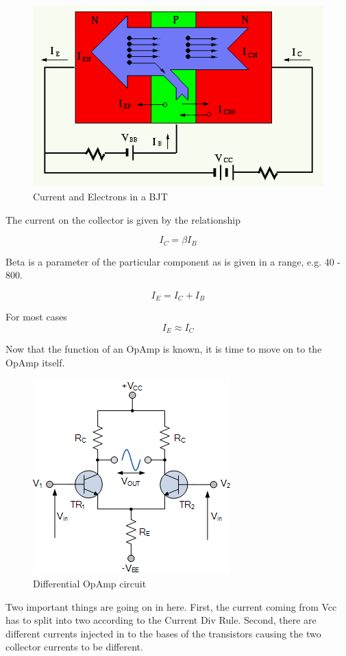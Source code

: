 \documentclass{article}
\begin{document}
	\begin{figure}[H]
		\centering
		\includegraphics[scale=0.75]{bjtelectrons2}
		\caption{Current and Electrons in a BJT\cite{bjt}}
	\end{figure}

	The current on the collector is given by the relationship

	\[I_C = {\beta}I_B \]

	Beta is a parameter of the particular component as is given in a range, e.g. 40 - 800.

	\[I_E = I_C + I_B \]

	For most cases \[I_E \approx I_C\]

	Now that the function of an OpAmp is known, it is time to move on to the
	OpAmp itself.

	\begin{figure}[H]
		\centering
		\includegraphics[scale=0.75]{OABones}
		\caption{Differential OpAmp circuit\cite{diff}}
	\end{figure}

	Two important things are going on in here. First, the current coming from Vcc
	has to split into two according to the Current Div Rule. Second, there are
	different currents injected in to the bases of the transistors causing the two
	collector currents to be different.
\end{document}
